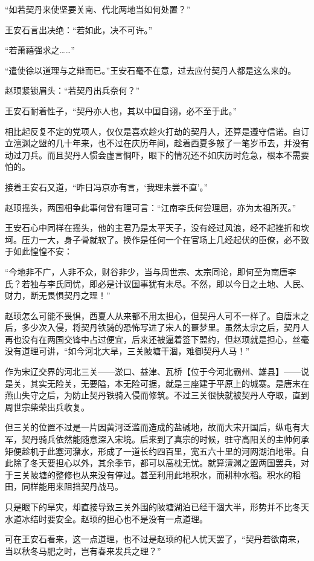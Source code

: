 “如若契丹来使坚要关南、代北两地当如何处置？”

王安石言出决绝：“若如此，决不可许。”

“若萧禧强求之……”

“遣使徐以道理与之辩而已。”王安石毫不在意，过去应付契丹人都是这么来的。

赵顼紧锁眉头：“若契丹出兵奈何？”

王安石耐着性子，“契丹亦人也，其以中国自诩，必不至于此。”

相比起反复不定的党项人，仅仅是喜欢趁火打劫的契丹人，还算是遵守信诺。自订立澶渊之盟的几十年来，也不过在庆历年间，趁着西夏多敲了一笔岁币去，并没有动过刀兵。而且契丹人惯会虚言恫吓，眼下的情况还不如庆历时危急，根本不需要怕的。

接着王安石又道，“昨日冯京亦有言，‘我理未尝不直’。”

赵顼摇头，两国相争此事何曾有理可言：“江南李氏何尝理屈，亦为太祖所灭。”

王安石心中同样在摇头，他的主君乃是太平天子，没有经过风浪，经不起挫折和坎坷。压力一大，身子骨就软了。换作是任何一个在官场上几经起伏的臣僚，必不致于如此惶惶不安：

“今地非不广，人非不众，财谷非少，当与周世宗、太宗同论，即何至为南唐李氏？若独与李氏同忧，即必是计议国事犹有未尽。不然，即以今日之土地、人民、财力，断无畏惧契丹之理！”

赵顼怎么可能不畏惧，西夏人从来都不用太担心，但契丹人可不一样了。自唐末之后，多少次入侵，将契丹铁骑的恐怖写进了宋人的噩梦里。虽然太宗之后，契丹人再也没有在两国交锋中占过便宜，后来还被逼着签下盟约，但赵顼就是担心，丝毫没有道理可讲，“如今河北大旱，三关陂塘干涸，难御契丹人马！”

作为宋辽交界的河北三关——淤口、益津、瓦桥【位于今河北霸州、雄县】——说是关，其实无险关，无要隘，本无险可据，就是三座建于平原上的城寨。是唐末在燕山失守之后，为防止契丹铁骑入侵而修筑。不过三关很快就被契丹人夺取，直到周世宗柴荣出兵收复。

但三关的位置不过是一片因黄河泛滥而造成的盐碱地，故而大宋开国后，纵屯有大军，契丹骑兵依然能随意深入宋境。后来到了真宗的时候，驻守高阳关的主帅何承矩便趁机于此塞河潴水，形成了一道长约四百里，宽五六十里的河网湖泊地带。自此除了冬天要担心以外，其余季节，都可以高枕无忧。就算澶渊之盟两国罢兵，对于三关陂塘的整修也从来没有停过。甚至利用此地积水，而耕种水稻。积水的稻田，同样能用来阻挡契丹战马。

只是眼下的旱灾，却直接导致三关外围的陂塘湖泊已经干涸大半，形势并不比冬天水道冰结时要安全。赵顼的担心也不是没有一点道理。

可在王安石看来，这一点道理，也不过是赵顼的杞人忧天罢了，“契丹若欲南来，当以秋冬马肥之时，岂有春来发兵之理？”

